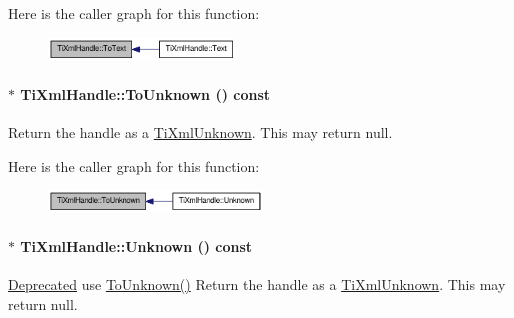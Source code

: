 Here is the caller graph for this function:\nopagebreak
\begin{figure}[H]
\begin{center}
\leavevmode
\includegraphics[width=141pt]{class_ti_xml_handle_a4ac53a652296203a5b5e13854d923586_icgraph}
\end{center}
\end{figure}
\hypertarget{class_ti_xml_handle_a1381c17507a130767b1e23afc93b3674}{
\paragraph[{ToUnknown}]{$\ast$ TiXmlHandle::ToUnknown () const}\hfill}
\label{class_ti_xml_handle_a1381c17507a130767b1e23afc93b3674}
Return the handle as a \hyperlink{class_ti_xml_unknown}{TiXmlUnknown}. This may return null. 

Here is the caller graph for this function:\nopagebreak
\begin{figure}[H]
\begin{center}
\leavevmode
\includegraphics[width=161pt]{class_ti_xml_handle_a1381c17507a130767b1e23afc93b3674_icgraph}
\end{center}
\end{figure}
\hypertarget{class_ti_xml_handle_a49675b74357ba2aae124657a9a1ef465}{
\paragraph[{Unknown}]{$\ast$ TiXmlHandle::Unknown () const}\hfill}
\label{class_ti_xml_handle_a49675b74357ba2aae124657a9a1ef465}
\begin{Desc}
\item[\hyperlink{deprecated__deprecated000004}{Deprecated}]use \hyperlink{class_ti_xml_handle_a1381c17507a130767b1e23afc93b3674}{ToUnknown()} Return the handle as a \hyperlink{class_ti_xml_unknown}{TiXmlUnknown}. This may return null. \end{Desc}


